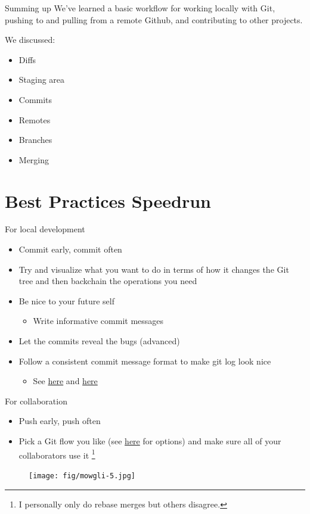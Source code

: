 \documentclass[pdf]{beamer} %
\begin{document}
\begin{frame}[t]{Summing up}
    We've learned a basic workflow for working locally with Git, pushing to and pulling from a remote Github, and contributing to other projects.

    We discussed:
    \begin{itemize}
        \item Diffs
        \item Staging area
        \item Commits
        \item Remotes
        \item Branches 
        \item Merging
    \end{itemize}
\end{frame}

\section{Best Practices Speedrun}
\begin{frame}[fragile]{For local development}
    \begin{itemize}
        \item Commit early, commit often
        \item Try and visualize what you want to do in terms of how it changes the Git tree and then backchain the operations you need
        \item Be nice to your future self
            \begin{itemize}
                \item Write informative commit messages
            \end{itemize}
        \item Let the commits reveal the bugs (advanced)
        \item Follow a consistent commit message format to make git log look nice
            \begin{itemize}
                \item See \href{https://tbaggery.com/2008/04/19/a-note-about-git-commit-messages.html}{here} and \href{https://github.com/joelparkerhenderson/git_commit_message#top-priorities}{here}
            \end{itemize}
    \end{itemize}
\end{frame}

\begin{frame}[t]{For collaboration}
    \begin{itemize}
        \item Push early, push often
        \item Pick a Git flow you like (see \href{https://www.atlassian.com/git/tutorials/comparing-workflows}{here} for options) and make sure all of your collaborators use it \footnote{I personally only do rebase merges but others disagree.}
    \end{itemize}
    \begin{figure}[htpb]
        \centering
        \texttt{[image: fig/mowgli-5.jpg]}
        \label{fig:mowgli-5}
    \end{figure}
\end{frame}
\end{document}
